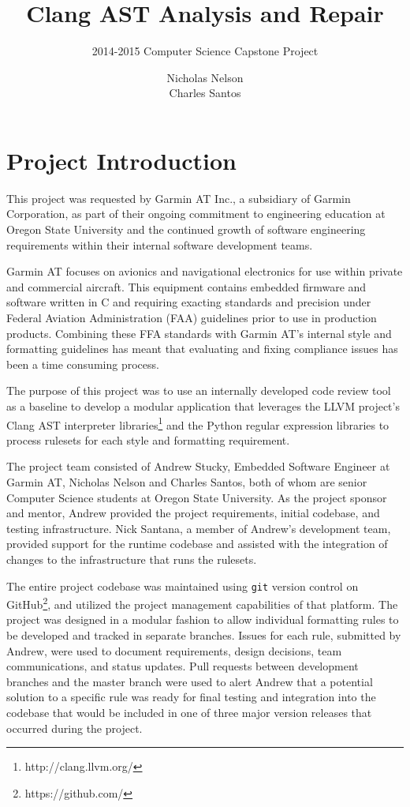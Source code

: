 \documentclass[11pt]{scrreprt}
\title{\textbf{Clang AST Analysis and Repair}}
\subtitle{2014-2015 Computer Science Capstone Project}
\author{Nicholas Nelson\\
		Charles Santos}
\date{}
\begin{document}
\maketitle

\tableofcontents

\chapter{Project Introduction}

This project was requested by Garmin AT Inc., a subsidiary of Garmin Corporation, as part of their ongoing commitment to engineering education at Oregon State University and the continued growth of software engineering requirements within their internal software development teams.

Garmin AT focuses on avionics and navigational electronics for use within private and commercial aircraft.
This equipment contains embedded firmware and software written in C and requiring exacting standards and precision under Federal Aviation Administration (FAA) guidelines prior 
to use in production products.
Combining these FFA standards with Garmin AT's internal style and formatting guidelines has meant that evaluating and fixing compliance issues has been a time consuming process.

The purpose of this project was to use an internally developed code review tool as a baseline to develop a modular application that leverages the LLVM project's Clang AST interpreter libraries\footnote{http://clang.llvm.org/} and the Python regular expression libraries to process rulesets for each style and formatting requirement.

The project team consisted of Andrew Stucky, Embedded Software Engineer at Garmin AT, Nicholas Nelson and Charles Santos, both of whom are senior Computer Science students at Oregon State University.
As the project sponsor and mentor, Andrew provided the project requirements, initial codebase, and testing infrastructure.
Nick Santana, a member of Andrew's development team, provided support for the runtime codebase and assisted with the integration of changes to the infrastructure that runs the rulesets.

The entire project codebase was maintained using \texttt{git} version control on GitHub\footnote{https://github.com/}, and utilized the project management capabilities of that platform.
The project was designed in a modular fashion to allow individual formatting rules to be developed and tracked in separate branches.
Issues for each rule, submitted by Andrew, were used to document requirements, design decisions, team communications, and status updates.
Pull requests between development branches and the master branch were used to alert Andrew that a potential solution to a specific rule was ready for final testing and integration into the codebase that would be included in one of three major version releases that occurred during the project.
\end{document}
